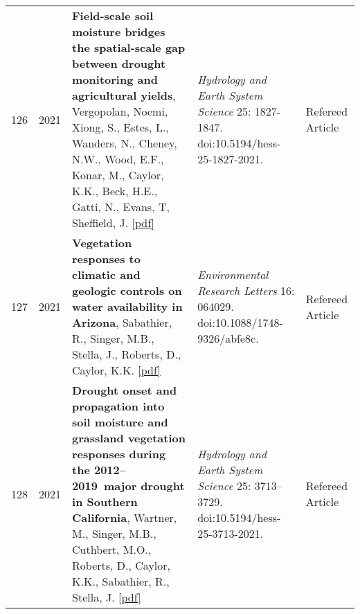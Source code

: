 \begin{longtable}{p{0.25cm}p{0.5cm}p{7.75cm}>{\raggedright}p{5.25cm}p{1.75cm}}
    126 & 2021 & {\bf Field-scale soil moisture bridges the spatial-scale gap between drought monitoring and agricultural yields}, Vergopolan, Noemi, Xiong, S., Estes, L., Wanders, N., Cheney, N.W., Wood, E.F., Konar, M., Caylor, K.K., Beck, H.E., Gatti, N., Evans, T, Sheffield, J. \href{https://ucsb.box.com/s/4kot7ejzflrneu9psoofu007y3s2cyrn}{[pdf]} & \emph{ Hydrology and Earth System Science } 25: 1827-1847. doi:10.5194/hess-25-1827-2021.  & Refereed Article\\
    127 & 2021 & {\bf Vegetation responses to climatic and geologic controls on water availability in Arizona}, Sabathier, R., Singer, M.B., Stella, J., Roberts, D., Caylor, K.K. \href{https://ucsb.box.com/s/4z0rdplsiv3udr0sljxkaeyycboy4icd}{[pdf]} & \emph{ Environmental Research Letters } 16: 064029. doi:10.1088/1748-9326/abfe8c.  & Refereed Article\\
    128 & 2021 & {\bf Drought onset and propagation into soil moisture and grassland vegetation responses during the 2012–2019 major drought in Southern California}, Wartner, M., Singer, M.B., Cuthbert, M.O., Roberts, D., Caylor, K.K., Sabathier, R., Stella, J. \href{https://ucsb.box.com/s/k4h0s8mbyla32elxcltp377ix8ua098h}{[pdf]} & \emph{ Hydrology and Earth System Science } 25: 3713–3729. doi:10.5194/hess-25-3713-2021.  & Refereed Article\\
\end{longtable}
